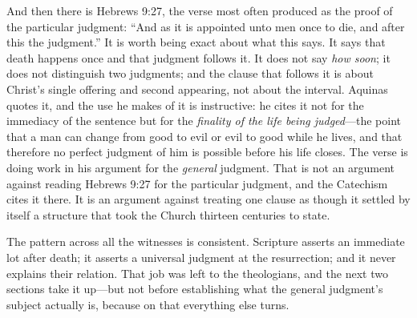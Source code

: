 And then there is Hebrews 9:27, the verse most often produced as the proof of the particular judgment: ``And as it is appointed unto men once to die, and after this the judgment.'' It is worth being exact about what this says. It says that death happens once and that judgment follows it. It does not say \emph{how soon}; it does not distinguish two judgments; and the clause that follows it is about Christ's single offering and second appearing, not about the interval. Aquinas quotes it, and the use he makes of it is instructive: he cites it not for the immediacy of the sentence but for the \emph{finality of the life being judged}---the point that a man can change from good to evil or evil to good while he lives, and that therefore no perfect judgment of him is possible before his life closes. The verse is doing work in his argument for the \emph{general} judgment. That is not an argument against reading Hebrews 9:27 for the particular judgment, and the Catechism cites it there. It is an argument against treating one clause as though it settled by itself a structure that took the Church thirteen centuries to state.

The pattern across all the witnesses is consistent. Scripture asserts an immediate lot after death; it asserts a universal judgment at the resurrection; and it never explains their relation. That job was left to the theologians, and the next two sections take it up---but not before establishing what the general judgment's subject actually is, because on that everything else turns.
